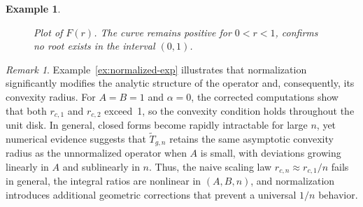 \documentclass[12pt,a4paper]{amsart}
\numberwithin{equation}{section}
\newtheorem{example}{Example}[section]
\theoremstyle{remark}
\newtheorem{remark}{Remark}[section]
\begin{document}
\begin{example}
\begin{figure}[ht]
\centering
{}
\caption{Plot of \(F(r)\).
The curve remains positive for \(0<r<1\), confirms no root exists in the interval $(0,1)$.}
\label{fig:F-r}
\end{figure}

\end{example}
\begin{remark}\label{rem:scaling-fails}
Example~\ref{ex:normalized-exp} illustrates that normalization significantly modifies the analytic structure of the operator and, consequently, its convexity radius.  
For \(A=B=1\) and \(\alpha=0\), the corrected computations show that both \(r_{c,1}\) and \(r_{c,2}\) exceed~1, so the convexity condition holds throughout the unit disk.  
In general, closed forms become rapidly intractable for large \(n\), yet numerical evidence suggests that \(\widetilde{T}_{g,n}\) retains the same asymptotic convexity radius as the unnormalized operator when \(A\) is small, with deviations growing linearly in \(A\) and sublinearly in \(n\).  
Thus, the naive scaling law \(r_{c,n}\approx r_{c,1}/n\) fails in general, the integral ratios are nonlinear in \((A,B,n)\), and normalization introduces additional geometric corrections that prevent a universal \(1/n\) behavior.  
\end{remark}
\end{document}
